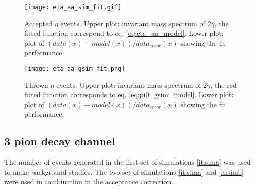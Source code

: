 \begin{figure}[!ht]
\centering
\texttt{[image: eta\_aa\_sim\_fit.gif]}
\caption{Accepted $\eta$ events. Upper plot: invariant mass spectrum of $2\gamma$, the fitted function correspond to eq. \eqref{eq:eta_aa_model}. Lower plot: plot of $(data(x)-model(x))/data_{error}(x)$ showing the fit performance.}
\label{fig:eta_aa_sim_fit}
\end{figure}
%
\begin{figure}[!ht]
\centering
\texttt{[image: eta\_aa\_gsim\_fit.png]}
\caption{Thrown $\eta$ events. Upper plot: invariant mass spectrum of $2\gamma$, the red fitted function corresponds to eq. \eqref{eq:pi0_gsim_model}. Lower plot: plot of $(data(x)-model(x))/data_{error}(x)$ showing the fit performance.}
\label{fig:eta_aa_gsim_fit}
\end{figure}
\clearpage
%
\subsection{3 pion decay channel}
\label{s:eta_3pi_AC}
The number of events generated in the first set of simulations \ref{it:sima} was used to make background studies. The two set of simulations \ref{it:sima} and \ref{it:simb} were used in combination in the acceptance correction. \\

%
%
